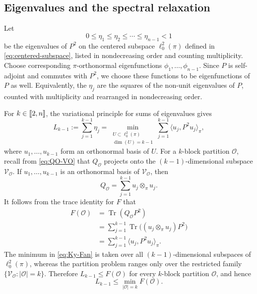 \documentclass[11pt]{article}
\newcommand{\1}{\mathbf{1}}
\providecommand{\llbracket}{\mathopen{[\mkern-2.7mu[}}
\providecommand{\rrbracket}{\mathclose{]\mkern-2.7mu]}}
\begin{document}

\subsection{Eigenvalues and the spectral relaxation}\label{subsec:spectralrelax}

Let
\[
0\leq\eta_1\leq\eta_2\leq\cdots\leq\eta_{n-1}<1
\]
be the eigenvalues of $P^2$ on the centered subspace
$\ell^2_0(\pi)$ defined in \eqref{eq:centered-subspace}, listed in
nondecreasing order and counting multiplicity.  Choose corresponding
$\pi$-orthonormal eigenfunctions
$\phi_1,\ldots,\phi_{n-1}$.  Since $P$ is self-adjoint and commutes
with $P^2$, we choose these functions to be eigenfunctions of $P$ as
well.  Equivalently, the $\eta_j$ are the squares of the non-unit
eigenvalues of $P$, counted with multiplicity and rearranged in
nondecreasing order.

For $k\in\llbracket 2,n\rrbracket$, the variational principle for sums of
eigenvalues gives
\begin{equation}
	L_{k-1}:=\sum_{j=1}^{k-1}\eta_j
	=\min_{\substack{U\subset\ell^2_0(\pi)\\ \dim(U)=k-1}}
	\sum_{j=1}^{k-1}\langle u_j,P^2u_j\rangle_\pi,
	\label{eq:Ky-Fan}
\end{equation}
where $u_1,\ldots,u_{k-1}$ form an orthonormal basis of $U$.  For a
$k$-block partition $\mathcal O$, recall from
\eqref{eq:QO-VO} that $Q_{\mathcal O}$ projects onto the
$(k-1)$-dimensional subspace $\mathcal V_{\mathcal O}$.  If
$u_1,\ldots,u_{k-1}$ is an orthonormal basis of
$\mathcal V_{\mathcal O}$, then
\[
Q_{\mathcal O}
=\sum_{j=1}^{k-1}u_j\otimes_\pi u_j.
\]
It follows from the trace identity for $F$ that
\begin{align*}
	F(\mathcal O)
	&=\operatorname{Tr}(Q_{\mathcal O}P^2)\\
	&=\sum_{j=1}^{k-1}
	\operatorname{Tr}\bigl(
	(u_j\otimes_\pi u_j)P^2
	\bigr)\\
	&=\sum_{j=1}^{k-1}
	\langle u_j,P^2u_j\rangle_\pi.
\end{align*}
The minimum in \eqref{eq:Ky-Fan} is taken over all
$(k-1)$-dimensional subspaces of $\ell^2_0(\pi)$, whereas the
partition problem ranges only over the restricted family
$\{\mathcal V_{\mathcal O}:|\mathcal O|=k\}$.  Therefore
$L_{k-1}\leq F(\mathcal O)$ for every $k$-block partition
$\mathcal O$, and hence
\begin{equation}
	L_{k-1}\leq
	\min_{|\mathcal O|=k}F(\mathcal O).
	\label{eq:relaxation-lower-bound}
\end{equation}
\end{document}
